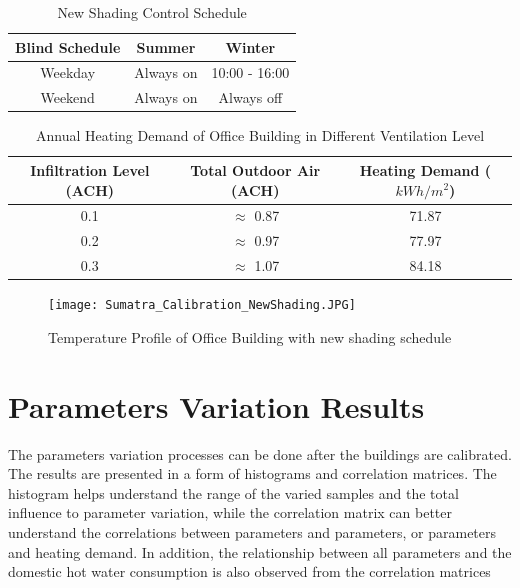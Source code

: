 		\begin{table}[htbp]
		\centering
		\caption{New Shading Control Schedule}
		    \begin{tabular}{ccc}
		    \toprule
		    Blind Schedule & Summer & Winter\\
		    \midrule
            Weekday & Always on & 10:00 - 16:00 \\
            Weekend & Always on & Always off\\
		    \bottomrule
		    \end{tabular}%
		  \label{tab:HonggShadingCtrl}%
		\end{table}%
            
            
		\begin{table}[htbp]
		\centering
		\caption{Annual Heating Demand of Office Building in Different Ventilation Level}
		    \begin{tabular}{ccc}
		    \toprule
		    Infiltration Level (ACH) & Total Outdoor Air (ACH) & Heating Demand ($kWh/m^2$)\\
		    \midrule
            0.1 & $\approx$ 0.87 & 71.87\\
            0.2 & $\approx$ 0.97 & 77.97\\
            0.3 & $\approx$ 1.07 & 84.18\\
            
		    \bottomrule
		    \end{tabular}%
		  \label{tab:SumatraVentLevel}%
		\end{table}%
		
		
            \begin{figure}[H]
			\centering
			\texttt{[image: Sumatra\_Calibration\_NewShading.JPG]}
			\caption{Temperature Profile of Office Building with new shading schedule}
			\label{fig:Sumatra_Calibration_NewShading}
			\end{figure}
			
	\section{Parameters Variation Results}

		The parameters variation processes can be done after the buildings are calibrated. The results are presented in a form of histograms and correlation matrices. The histogram helps understand the range of the varied samples and the total influence to parameter variation, while the correlation matrix can better understand the correlations between parameters and parameters, or parameters and heating demand. In addition, the relationship between all parameters and the domestic hot water consumption is also observed from the correlation matrices\\
		
